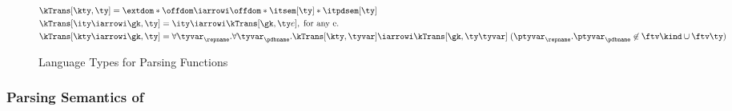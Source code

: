 \begin{figure}
\small
\fbox{$\kTrans[\gk,\ty] = \ity$} 
    
\begin{align*}
  &\kTrans[\kty,\ty] = \extdom * \offdom \iarrowi \offdom * \itsem[\ty] * \itpdsem[\ty]
   \\
   &\kTrans[\ity \iarrowi \gk,\ty] = \ity \iarrowi \kTrans[\gk,\ty e],
   \; \mbox{for any e}.
   \\
   &\kTrans[\kty \iarrowi \gk,\ty] = 
      \forall\tyvar_\repname.\forall\tyvar_\pdbname.
         \kTrans[\kty,\tyvar] \iarrowi \kTrans[\gk,\ty \tyvar]\; 
         (\ptyvar_\repname.\ptyvar_\pdbname \not \in \ftv \kind \cup
         \ftv \ty)
\end{align*}  
  \caption{\Implang{} Language Types for Parsing Functions}
  \label{fig:parser-types}
\end{figure}

\subsubsection{Parsing Semantics of \ddc{}}
\label{sec:parse-sem}

